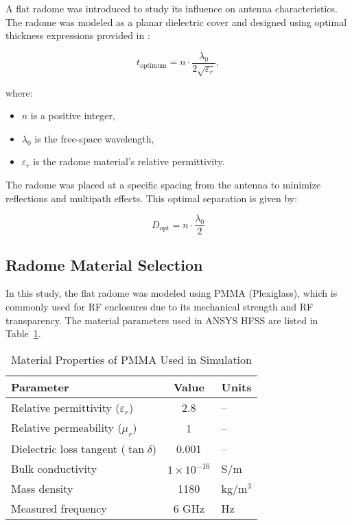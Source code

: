 A flat radome was introduced to study its influence on antenna characteristics. The radome was modeled as a planar dielectric cover and designed using optimal thickness expressions provided in \cite{swra705}:

\begin{equation}
t_{\text{optimum}} = n \cdot \frac{\lambda_0}{2 \sqrt{\varepsilon_r}},
\end{equation}

where:
\begin{itemize}
    \item $n$ is a positive integer,
    \item $\lambda_0$ is the free-space wavelength,
    \item $\varepsilon_r$ is the radome material's relative permittivity.
\end{itemize}

The radome was placed at a specific spacing from the antenna to minimize reflections and multipath effects. This optimal separation is given by:

\begin{equation}
D_{\text{opt}} = n \cdot \frac{\lambda_0}{2}
\end{equation}

\subsection*{Radome Material Selection}

In this study, the flat radome was modeled using PMMA (Plexiglass), which is commonly used for RF enclosures due to its mechanical strength and RF transparency. The material parameters used in ANSYS HFSS are listed in Table~\ref{tab:pmma-properties}.

\begin{table}[htbp]
\centering
\caption{Material Properties of PMMA Used in Simulation}
\begin{tabular}{lcl}
\toprule
\textbf{Parameter} & \textbf{Value} & \textbf{Units} \\
\midrule
Relative permittivity ($\varepsilon_r$) & 2.8 & -- \\
Relative permeability ($\mu_r$) & 1 & -- \\
Dielectric loss tangent ($\tan\delta$) & 0.001 & -- \\
Bulk conductivity & $1 \times 10^{-16}$ & S/m \\
Mass density & 1180 & kg/m$^3$ \\
Measured frequency & 6 GHz & Hz \\
\bottomrule
\end{tabular}
\label{tab:pmma-properties}
\end{table}

